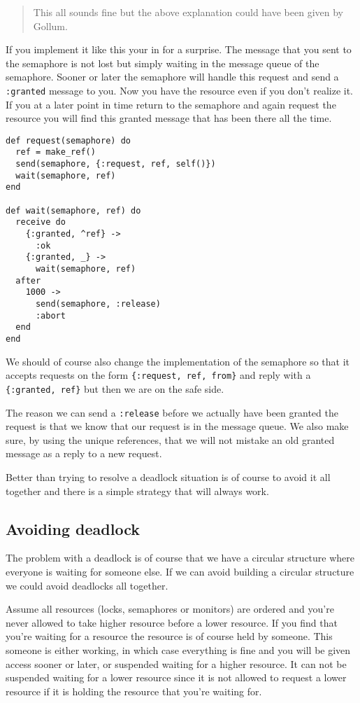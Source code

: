 \documentclass[a4paper,11pt]{article}
\begin{document}
\begin{quotation}
This all sounds fine but the above explanation could have been given
by Gollum.
\end{quotation}

If you implement it like this your in for a surprise. The message that
you sent to the semaphore is not lost but simply waiting in the
message queue of the semaphore. Sooner or later the semaphore will
handle this request and send a {\tt :granted} message to you. Now you
have the resource even if you don't realize it. If you at a later point
in time return to the semaphore and again request the resource you
will find this granted message that has been there all the time.

\begin{verbatim}
def request(semaphore) do
  ref = make_ref()
  send(semaphore, {:request, ref, self()})
  wait(semaphore, ref)
end

def wait(semaphore, ref) do
  receive do
    {:granted, ^ref} ->
      :ok
    {:granted, _} ->
      wait(semaphore, ref)
  after
    1000 ->
      send(semaphore, :release)
      :abort
  end
end
\end{verbatim}

We should of course also change the implementation of the semaphore so
that it accepts requests on the form {\tt \{:request, ref, from\}} and
reply with a {\tt \{:granted, ref\}} but then we are on the safe side.

The reason we can send a {\tt :release} before we actually have been
granted the request is that we know that our request is in the message
queue. We also make sure, by using the unique references, that we will
not mistake an old granted message as a reply to a new request. 

Better than trying to resolve a deadlock situation is of course to
avoid it all together and there is a simple strategy that will always work. 


\subsection{Avoiding deadlock}

The problem with a deadlock is of course that we have a circular
structure where everyone is waiting for someone else. If we can avoid
building a circular structure we could avoid deadlocks all together.

Assume all resources (locks, semaphores or monitors) are ordered and
you're never allowed to take higher resource before a lower
resource. If you find that you're waiting for a resource the resource
is of course held by someone. This someone is either working, in which
case everything is fine and you will be given access sooner or later,
or suspended waiting for a higher resource. It can not be suspended
waiting for a lower resource since it is not allowed to request a
lower resource if it is holding the resource that you're waiting for.
\end{document}
